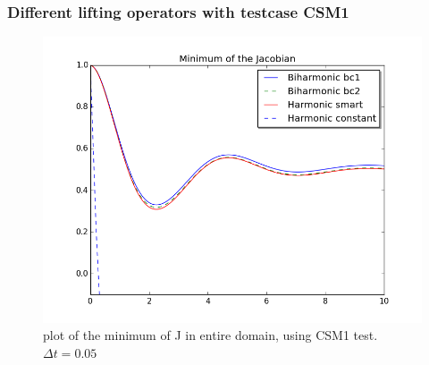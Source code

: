 \subsubsection*{Different lifting operators with testcase CSM1}
\begin{figure}[H]
\label{fig:fluid_structure}
\includegraphics[scale=0.60, trim={0mm 0mm 0mm 0mm},clip]{./Verification_Validation/Mesh_motion_results/CSM1.png}
\caption{plot of the minimum of J in entire domain, using CSM1 test. $\Delta t = 0.05$}
\end{figure}

